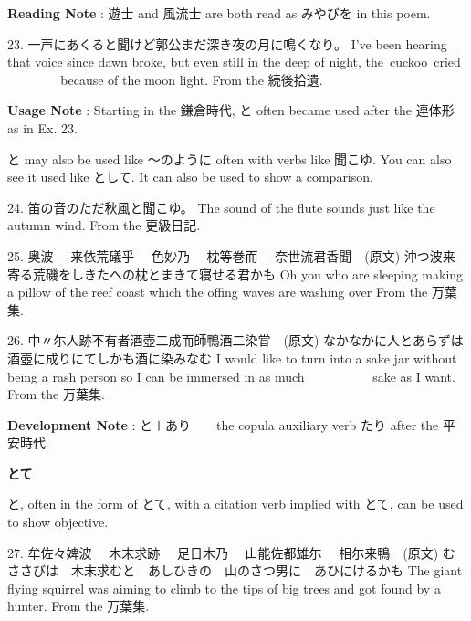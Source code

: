 \par{\textbf{Reading Note }: 遊士 and 風流士 are both read as みやびを in this poem. }

\par{23. 一声にあくると聞けど郭公まだ深き夜の月に鳴くなり。 \hfill\break
I've been hearing that voice since dawn broke, but even still in the deep of night, the cuckoo cried           because of the moon light. \hfill\break
From the 続後拾遺. }

\par{\textbf{Usage Note }: Starting in the 鎌倉時代, と often became used after the 連体形 as in Ex. 23. }
 
\par{ と may also be used like ～のように often with verbs like 聞こゆ. You can also see it used like として. It can also be used to show a comparison.  }
 
\par{24. 笛の音のただ秋風と聞こゆ。 \hfill\break
The sound of the flute sounds just like the autumn wind. \hfill\break
From the 更級日記. }

\par{25. 奥波　 来依荒礒乎　 色妙乃 　枕等巻而 　奈世流君香聞　(原文) \hfill\break
沖つ波来寄る荒磯をしきたへの枕とまきて寝せる君かも \hfill\break
Oh you who are sleeping making a pillow of the reef coast which the offing waves are washing over \hfill\break
From the 万葉集. }
 
\par{26. 中〃尓人跡不有者酒壺二成而師鴨酒二染甞　(原文) \hfill\break
なかなかに人とあらずは酒壺に成りにてしかも酒に染みなむ \hfill\break
I would like to turn into a sake jar without being a rash person so I can be immersed in as much             sake as I want. \hfill\break
From the 万葉集. }
 
\par{\textbf{Development Note }: と＋あり　\textrightarrow 　the copula auxiliary verb たり after the 平安時代. }

\begin{center}
 \textbf{とて }
\end{center}
 
\par{と, often in the form of とて, with a citation verb implied with とて, can be used to show objective. }

\par{27. 牟佐々婢波　 木末求跡　 足日木乃 　山能佐都雄尓　 相尓来鴨　(原文) \hfill\break
むささびは　木末求むと　あしひきの　山のさつ男に　あひにけるかも \hfill\break
The giant flying squirrel was aiming to climb to the tips of big trees and got found by a hunter. \hfill\break
From the 万葉集. }
 
